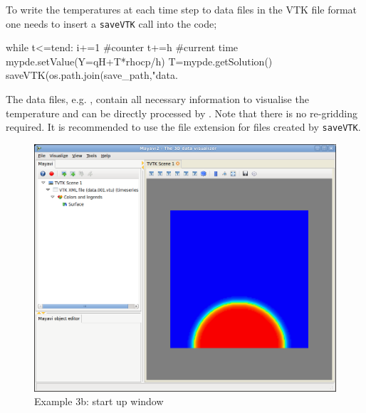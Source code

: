 To write the temperatures at each time step to data files in the VTK file format
one needs to insert a \verb|saveVTK| call into the code;
\begin{python}
while t<=tend:
      i+=1 #counter
      t+=h #current time
      mypde.setValue(Y=qH+T*rhocp/h)
      T=mypde.getSolution()
      saveVTK(os.path.join(save_path,"data.%
\end{python}
The data files, e.g. , contain all necessary information to 
visualise the temperature and can be directly processed by \mayavi. Note that
there is no re-gridding required. It is recommended to use the file extension
 for files created by \verb|saveVTK|. 

\begin{figure}[ht]
\centerline{\includegraphics[width=4.in]{figures/ScreeshotMayavi2n1}}
\caption{Example 3b: \mayavi start up window}
\label{fig:mayavi window}
\end{figure}

